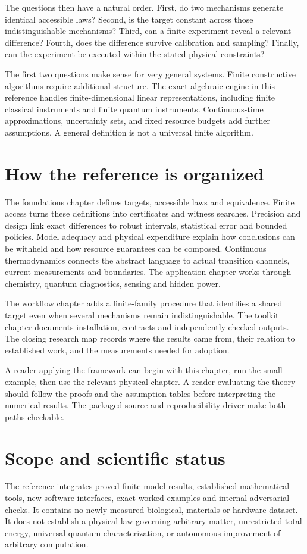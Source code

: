 The questions then have a natural order. First, do two mechanisms generate identical accessible laws? Second, is the target constant across those indistinguishable mechanisms? Third, can a finite experiment reveal a relevant difference? Fourth, does the difference survive calibration and sampling? Finally, can the experiment be executed within the stated physical constraints?

The first two questions make sense for very general systems. Finite constructive algorithms require additional structure. The exact algebraic engine in this reference handles finite-dimensional linear representations, including finite classical instruments and finite quantum instruments. Continuous-time approximations, uncertainty sets, and fixed resource budgets add further assumptions. A general definition is not a universal finite algorithm.

\section{How the reference is organized}
The foundations chapter defines targets, accessible laws and equivalence. Finite access turns these definitions into certificates and witness searches. Precision and design link exact differences to robust intervals, statistical error and bounded policies. Model adequacy and physical expenditure explain how conclusions can be withheld and how resource guarantees can be composed. Continuous thermodynamics connects the abstract language to actual transition channels, current measurements and boundaries. The application chapter works through chemistry, quantum diagnostics, sensing and hidden power.

The workflow chapter adds a finite-family procedure that identifies a shared target even when several mechanisms remain indistinguishable. The toolkit chapter documents installation, contracts and independently checked outputs. The closing research map records where the results came from, their relation to established work, and the measurements needed for adoption.

A reader applying the framework can begin with this chapter, run the small example, then use the relevant physical chapter. A reader evaluating the theory should follow the proofs and the assumption tables before interpreting the numerical results. The packaged source and reproducibility driver make both paths checkable.

\section{Scope and scientific status}
The reference integrates proved finite-model results, established mathematical tools, new software interfaces, exact worked examples and internal adversarial checks. It contains no newly measured biological, materials or hardware dataset. It does not establish a physical law governing arbitrary matter, unrestricted total energy, universal quantum characterization, or autonomous improvement of arbitrary computation.

